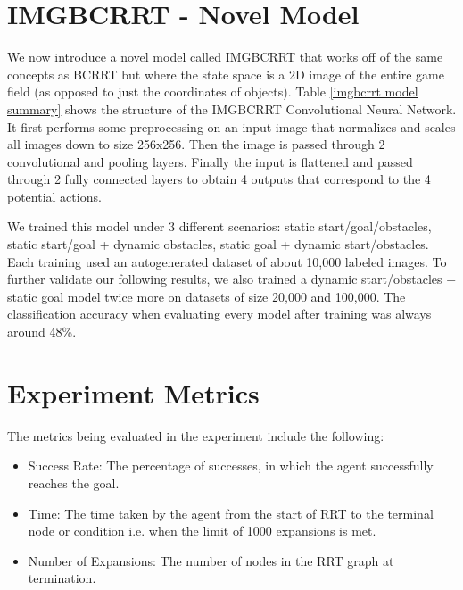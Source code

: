 \documentclass{article}
\begin{document}
\section{IMGBCRRT - Novel Model}

We now introduce a novel model called IMGBCRRT that works off of the same concepts as BCRRT but where the state space is a 2D image of the entire game field (as opposed to just the coordinates of objects). 
Table \ref{imgbcrrt model summary} shows the structure of the IMGBCRRT Convolutional Neural Network. It first performs some preprocessing on an input image that normalizes and scales all images down to size 256x256. Then the image is passed through 2 convolutional and pooling layers. Finally the input is flattened and passed through 2 fully connected layers to obtain 4 outputs that correspond to the 4 potential actions.

We trained this model under 3 different scenarios: static start/goal/obstacles, static start/goal + dynamic obstacles, static goal + dynamic start/obstacles. Each training used an autogenerated dataset of about 10,000 labeled images. 
To further validate our following results, we also trained a dynamic start/obstacles + static goal model twice more on datasets of size 20,000 and 100,000. The classification accuracy when evaluating every model after training was always around 48\%.

\section{Experiment Metrics}

The metrics being evaluated in the experiment include the following:
\begin{itemize}
	\item{Success Rate: The percentage of successes, in which the agent successfully reaches the goal.}
	\item{Time: The time taken by the agent from the start of RRT to the terminal node or condition i.e. when the limit of 1000 expansions is met.}
	\item{Number of Expansions: The number of nodes in the RRT graph at termination.}
\end{itemize}
\end{document}
